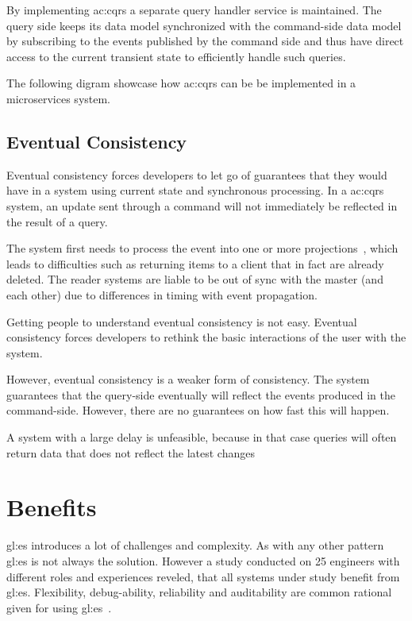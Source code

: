 By implementing \gls{ac:cqrs} a separate query handler service is maintained. The query side keeps its data model synchronized with the command-side data model by subscribing to the events published by the command side and thus have direct access to the current transient state to efficiently handle such queries.

The following digram showcase how \gls{ac:cqrs} can be be implemented in a microservices system.


\subsection{Eventual Consistency}

Eventual consistency forces developers to let go of guarantees that they would have in a system using current state and synchronous processing. In a \gls{ac:cqrs} system, an update sent through a command will not immediately be reflected in the result of a query. 

The system first needs to process the event into one or more projections~\citep{OVEREEM2021110970}, which leads to difficulties such as returning items to a client that in fact are already deleted. The reader systems are liable to be out of sync with the master (and each other) due to differences in timing with event propagation.

Getting people to understand eventual consistency is not easy. Eventual consistency forces developers to rethink the basic interactions of the user with the system. 

However, eventual consistency is a weaker form of consistency. The system guarantees that the query-side eventually will reflect the events produced in the command-side. However, there are no guarantees on how fast this will happen. 

A system with a large delay is unfeasible, because in that case queries will often return data that does not reflect the latest changes

\pagebreak

\section{Benefits}

\gls{gl:es} introduces a lot of challenges and complexity. As with any other pattern \gls{gl:es} is not always the solution. However a study conducted on 25 engineers with different roles and experiences reveled, that all systems under study benefit from \gls{gl:es}. Flexibility, debug-ability, reliability and auditability are common rational given for using \gls{gl:es}~\citep{OVEREEM2021110970}.

